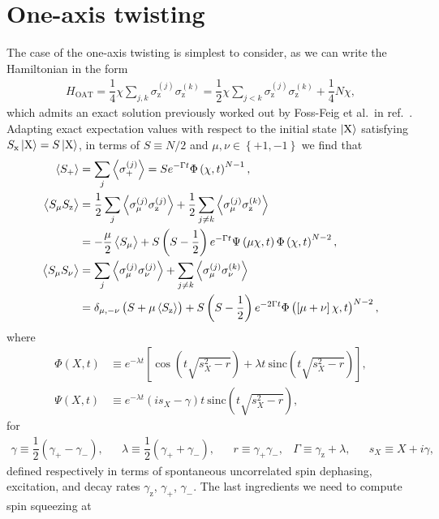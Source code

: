 \documentclass[aps,notitlepage,nofootinbib,11pt]{revtex4-1}
\renewcommand{\t}{\text} %
\newcommand{\f}[2]{\dfrac{#1}{#2}} %
\newcommand{\p}[1]{\left(#1\right)} %
\renewcommand{\sp}[1]{\left[#1\right]} %
\renewcommand{\set}[1]{\left\{#1\right\}} %
\newcommand{\bk}{\Braket} %
\newcommand{\z}{\text{z}}
\newcommand{\x}{\text{x}}
\newcommand{\X}{\text{X}}
\newcommand{\1}{\mathds{1}}
\begin{document}
\section{One-axis twisting}

The case of the one-axis twisting is simplest to consider, as we can
write the Hamiltonian in the form
\begin{align}
  H_{\t{OAT}} = \f14 \chi \sum_{j,k} \sigma_\z^{(j)} \sigma_\z^{(k)}
  = \f12 \chi \sum_{j<k} \sigma_\z^{(j)} \sigma_\z^{(k)} + \f14 N \chi,
\end{align}
which admits an exact solution previously worked out by Foss-Feig et
al.~in ref.~\cite{foss-feig2013nonequilibrium}.  Adapting exact
expectation values with respect to the initial state $\ket{\X}$
satisfying $S_\x\ket{\X}=S\ket{\X}$, in terms of $S\equiv N/2$ and
$\mu,\nu\in\set{+1,-1}$ we find that
\begin{align}
  \bk{S_+}
  &= \sum_j\bk{\sigma_+^{(j)}}
  = S e^{-\Gamma t} \Phi\p{\chi,t}^{N-1}, \label{eq:S+_OAT} \\
  \bk{S_\mu S_\z}
  &= \f12\sum_j\bk{\sigma_\mu^{(j)}\sigma_\z^{(j)}}
  + \f12\sum_{j\ne k} \bk{\sigma_\mu^{(j)} \sigma_\z^{(k)}} \\
  &= -\f{\mu}{2}\bk{S_\mu} + S \p{S-\f12} e^{-\Gamma t}
  \Psi\p{\mu\chi,t} \Phi\p{\chi,t}^{N-2}, \\
  \bk{S_\mu S_\nu}
  &= \sum_j \bk{\sigma_\mu^{(j)} \sigma_\nu^{(j)}}
  + \sum_{j\ne k} \bk{\sigma_\mu^{(j)} \sigma_\nu^{(k)}} \\
  &= \delta_{\mu,-\nu} \p{S + \mu\bk{S_\z}}
  + S \p{S-\f12} e^{-2\Gamma t}
  \Phi\p{\sp{\mu+\nu}\chi,t}^{N-2}, \label{eq:SS+-_OAT}
\end{align}
where
\begin{align}
  \Phi\p{X,t}
  &\equiv e^{-\lambda t} \sp{\cos\p{t\sqrt{s_X^2-r}}
    + \lambda t~\t{sinc}\p{t\sqrt{s_X^2-r}}},
  \\
  \Psi\p{X,t}
  &\equiv e^{-\lambda t} \p{is_X-\gamma}t~
  \t{sinc}\p{t\sqrt{s_X^2-r}},
\end{align}
for
\begin{align}
  \gamma \equiv \f12 \p{\gamma_+ - \gamma_-},
  &&
  \lambda \equiv \f12 \p{\gamma_+ + \gamma_-},
  &&
  r \equiv \gamma_+ \gamma_-,
  &
  \Gamma \equiv \gamma_\z + \lambda,
  &&
  s_X \equiv X + i\gamma,
\end{align}
defined respectively in terms of spontaneous uncorrelated spin
dephasing, excitation, and decay rates $\gamma_\z$, $\gamma_+$,
$\gamma_-$.  The last ingredients we need to compute spin squeezing at
\end{document}
